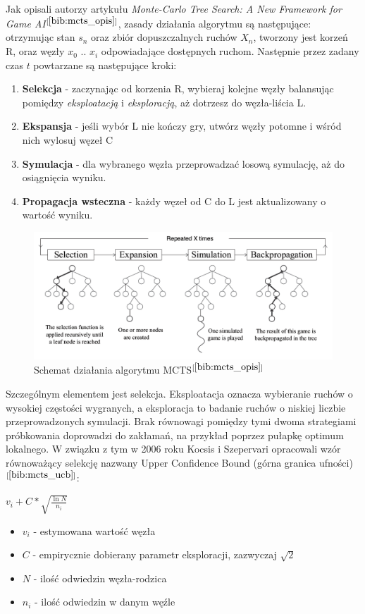 Jak opisali autorzy artykułu \textit{Monte-Carlo Tree Search: A New Framework for Game AI}$^{[\ref{bib:mcts_opis}]}$, zasady działania algorytmu są następujące: otrzymując stan $s_n$ oraz zbiór dopuszczalnych ruchów $X_n$, tworzony jest korzeń R, oraz węzły $x_0$ .. $x_i$ odpowiadające dostępnych ruchom. Następnie przez zadany czas $t$ powtarzane są następujące kroki:
\begin{enumerate}
	\item \textbf{Selekcja} - zaczynając od korzenia R, wybieraj kolejne węzły balansując pomiędzy \textit{eksploatacją} i \textit{eksploracją}, aż dotrzesz do węzła-liścia L.
	\item \textbf{Ekspansja} - jeśli wybór L nie kończy gry, utwórz węzły potomne i wśród nich wylosuj węzeł C
	\item \textbf{Symulacja} - dla wybranego węzła przeprowadzać losową symulację, aż do osiągnięcia wyniku.
	\item \textbf{Propagacja wsteczna} - każdy węzeł od C do L jest aktualizowany o wartość wyniku.
\end{enumerate}
\begin{figure}[h]
	\centering
	\includegraphics[scale=0.5]{Resources/mcts.png}
	\caption{Schemat działania algorytmu MCTS$^{[\ref{bib:mcts_opis}]}$} 
	\label{fig:llMainImage}
\end{figure}
Szczególnym elementem jest selekcja. Eksploatacja oznacza wybieranie ruchów o wysokiej częstości wygranych, a eksploracja to badanie ruchów o niskiej liczbie przeprowadzonych symulacji. Brak równowagi pomiędzy tymi dwoma strategiami próbkowania doprowadzi do zakłamań, na przykład poprzez pułapkę optimum lokalnego. W związku z tym w 2006 roku Kocsis i Szepervari opracowali wzór równoważący selekcję nazwany Upper Confidence Bound (górna granica ufności)$^{[\ref{bib:mcts_ucb}]}$:
\begin{center}
	${v_i} + C*\sqrt{\frac{\ln{N}}{n_i}}$
\end{center}
\begin{itemize}
	\item $v_i$ - estymowana wartość węzła
	\item $C$ - empirycznie dobierany parametr eksploracji, zazwyczaj $\sqrt{2}$
	\item $N$ - ilość odwiedzin węzła-rodzica
	\item $n_i$ - ilość odwiedzin w danym węźle
\end{itemize}